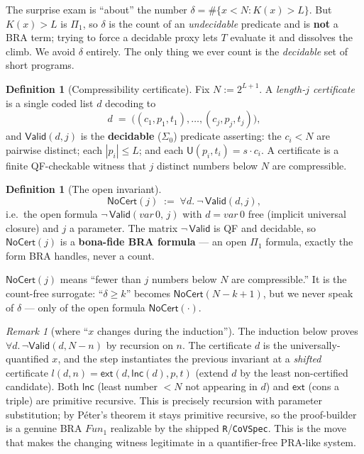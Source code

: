 \documentclass[11pt]{article}
\theoremstyle{plain}
\theoremstyle{definition}
\newtheorem{definition}[theorem]{Definition}
\theoremstyle{remark}
\newtheorem{remark}[theorem]{Remark}
\newcommand{\evalU}{\mathsf{U}}
\newcommand{\Valid}{\mathsf{Valid}}
\newcommand{\NoCert}{\mathsf{NoCert}}
\newcommand{\ext}{\mathsf{ext}}
\newcommand{\lnc}{\mathsf{lnc}}
\begin{document}
The surprise exam is ``about'' the number $\delta=\#\{x<N : K(x)>L\}$. But $K(x)>L$
is $\Pi_1$, so $\delta$ is the count of an \emph{undecidable} predicate and is
\textbf{not} a BRA term; trying to force a decidable proxy lets $T$ evaluate it and
dissolves the climb. We avoid $\delta$ entirely. The only thing we ever count is the
\emph{decidable} set of short programs.

\begin{definition}[Compressibility certificate]
Fix $N := 2^{L+1}$. A \emph{length-$j$ certificate} is a single coded list
$d$ decoding to
\[
  d \;=\; \big((c_1,p_1,t_1),\dots,(c_j,p_j,t_j)\big),
\]
and $\Valid(d,j)$ is the \textbf{decidable} ($\Sigma_0$) predicate asserting:
the $c_i<N$ are pairwise distinct; each $|p_i|\le L$; and each $\evalU(p_i,t_i)=s\cdot c_i$.
A certificate is a finite QF-checkable witness that $j$ distinct numbers below $N$
are compressible.
\end{definition}

\begin{definition}[The open invariant]
\[
  \NoCert(j) \;:=\; \forall d.\ \neg\,\Valid(d,j),
\]
i.e.\ the open formula $\neg\,\Valid(\mathit{var}\,0,\,j)$ with $d=\mathit{var}\,0$ free
(implicit universal closure) and $j$ a parameter. The matrix $\neg\,\Valid$ is QF and
decidable, so $\NoCert(j)$ is a \textbf{bona-fide BRA formula} --- an open $\Pi_1$
formula, exactly the form BRA handles, never a count.
\end{definition}

\noindent$\NoCert(j)$ means ``fewer than $j$ numbers below $N$ are compressible.''
It is the count-free surrogate: ``$\delta\ge k$'' becomes $\NoCert(N-k+1)$, but we
never speak of $\delta$ --- only of the open formula $\NoCert(\cdot)$.

\begin{remark}[where ``$x$ changes during the induction'']
The induction below proves $\forall d.\,\neg\Valid(d,N-n)$ by recursion on $n$. The
certificate $d$ is the universally-quantified $x$, and the step instantiates the
previous invariant at a \emph{shifted} certificate $l(d,n)=\ext(d,\lnc(d),p,t)$
(extend $d$ by the least non-certified candidate). Both $\lnc$ (least number $<N$
not appearing in $d$) and $\ext$ (cons a triple) are primitive recursive. This is
precisely recursion with parameter substitution; by P\'eter's theorem it stays
primitive recursive, so the proof-builder is a genuine BRA $\mathit{Fun}_1$
realizable by the shipped \texttt{R}/\texttt{CoVSpec}. This is the move that makes
the changing witness legitimate in a quantifier-free PRA-like system.
\end{remark}
\end{document}
